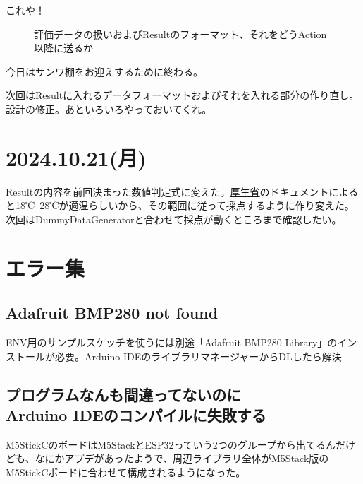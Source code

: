 \documentclass[twocolumn]{mynote}
\begin{document}
これや！
\fboxsep=0pt            %
\fboxrule=1pt            %
\begin{figure}[h]
  \centering
  \caption{評価データの扱いおよびResultのフォーマット、それをどうAction以降に送るか}
  \label{fig:EcaluateFormat}
\end{figure}

今日はサンワ棚をお迎えするために終わる。

次回はResultに入れるデータフォーマットおよびそれを入れる部分の作り直し。設計の修正。あといろいろやっておいてくれ。

\section*{2024.10.21(月)}
Resultの内容を前回決まった数値判定式に変えた。\href{https://www.mhlw.go.jp/content/11300000/000905329.pdf}{厚生省}のドキュメントによると18℃~28℃が適温らしいから、その範囲に従って採点するように作り変えた。次回はDummyDataGeneratorと合わせて採点が動くところまで確認したい。

\section*{エラー集}
\subsection*{Adafruit BMP280 not found}
ENV用のサンプルスケッチを使うには別途「Adafruit BMP280 Library」のインストールが必要。Arduino IDEのライブラリマネージャーからDLしたら解決

\subsection*{プログラムなんも間違ってないのに\\Arduino IDEのコンパイルに失敗する}
M5StickCのボードはM5StackとESP32っていう2つのグループから出てるんだけども、なにかアプデがあったようで、周辺ライブラリ全体がM5Stack版のM5StickCボードに合わせて構成されるようになった。
\end{document}
